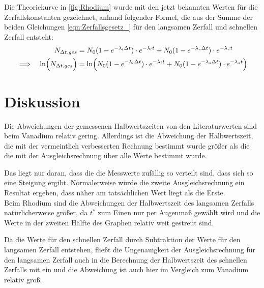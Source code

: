 \documentclass[titlepage = firstcover]{scrartcl}
\begin{document}
            Die Theoriekurve in \autoref{fig:Rhodium} wurde mit den jetzt bekannten Werten für die Zerfallskonstanten gezeichnet, anhand folgender Formel, die aus der Summe der beiden Gleichungen \ref{eqn:Zerfallsgesetz_} für den langsamen Zerfall und schnellen Zerfall entsteht:
            \begin{align*}
                &&N_{\Delta t, ges} &= N_0 (1 - e^{-\lambda_l \Delta t}) \cdot e^{-\lambda_l t} + N_0 (1 - e^{-\lambda_s \Delta t}) \cdot e^{-\lambda_s t} \\
                \implies &&\ln\Bigl(N_{\Delta t, ges} \Bigr) &= \ln\Bigl(N_0 (1 - e^{-\lambda_l \Delta t}) \cdot e^{-\lambda_l t} + N_0 (1 - e^{-\lambda_s \Delta t}) \cdot e^{-\lambda_s t} \Bigr)
            \end{align*}
      
    \newpage
    \section{Diskussion}
        Die Abweichungen der gemessenen Halbwertszeiten von den Literaturwerten sind beim Vanadium relativ gering.
        Allerdings ist die Abweichung der Halbwertszeit, die mit der vermeintlich verbesserten Rechnung bestimmt wurde größer als die die mit der Ausgleichsrechnung über alle Werte bestimmt wurde.

        Das liegt nur daran, dass die die Messwerte zufällig so verteilt sind, dass sich so eine Steigung ergibt. Normalerweise würde die zweite Ausgleichsrechnung ein Resultat ergeben, dass näher am tatsächlichen Wert liegt als die Erste. \\

        Beim Rhodium sind die Abweichungen der Halbwertszeit des langsamen Zerfalls natürlicherweise größer, da $t^*$ zum Einen nur per Augenmaß gewählt wird und die Werte in der zweiten Hälfte des Graphen relativ weit gestreut sind.

        Da die Werte für den schnellen Zerfall durch Subtraktion der Werte für den langsamen Zerfall entstehen, fließt die Ungenauigkeit der Ausgleichsrechnung für den langsamen Zerfall auch in die Berechnung der Halbwertszeit des schnellen Zerfalls mit ein und die Abweichung ist auch hier im Vergleich zum Vanadium relativ groß.



    
    \newpage
\end{document}
